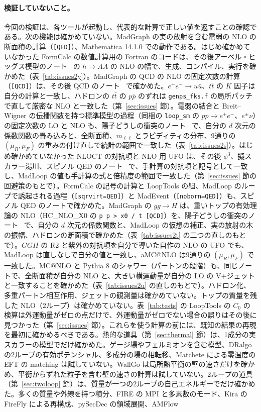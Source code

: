 \documentclass[a4paper,10pt]{ltjsarticle}
\begin{document}
\paragraph{検証していないこと。}今回の検証は、各ツールが起動し、代表的な計算で正しい値を返すことの確認である。次の機能は確かめていない。MadGraph の実の放射を含む電弱の NLO の断面積の計算（\texttt{[QED]}）、Mathematica 14.1.0 での動作である。はじめ確かめていなかった FormCalc の数値計算用の Fortran のコードは、その後アーベル・ヒッグス模型のノート~\cite{ahnote} の $h\to AA$ の NLO の幅で、生成、コンパイル、実行を確かめた（表~\ref{tab:issues2y}）。MadGraph の QCD の NLO の固定次数の計算（\texttt{[QCD]}）は、その後 QCD のノート~\cite{qcdnote} で確かめた。$e^+e^-\to u\bar u$、$t\bar t$ の $K$ 因子は自分の計算と一致し、ハドロンの $t\bar t$ の $p\bar p$ のずれは \texttt{genps\_fks.f} の局所パッチで直して厳密な NLO と一致した（第~\ref{sec:issues} 節）。電弱の結合と Breit--Wigner の伝播関数を持つ標準模型の過程（同梱の \texttt{loop\_sm} の $pp\to e^+e^-$、$e^\pm\nu$）の固定次数の LO と NLO も、陽子どうしの衝突のノート~\cite{ppnote} で、自分の $d$ 次元の係数関数の畳み込みと、全断面積、$m_{\ell\ell}$ とラピディティの分布、9通りの $(\mu_R,\mu_F)$ の重みの付け直しで統計の範囲で一致した（表~\ref{tab:issues2s}）。はじめ確かめていなかった NLOCT の対抗項と NLO 用 UFO は、その後 $\phi^3$、擬スカラー湯川、スピノル QED のノート~\cite{phi3note,yukawanote,qednote} で、手計算の対抗項と記号として一致し、MadLoop の値も手計算の式と倍精度の範囲で一致した（第~\ref{sec:issues} 節の回避策のもとで）。FormCalc の記号の計算と LoopTools の組、MadLoop のループで誘起される過程（\texttt{[sqrvirt=QED]}）と MadEvent（\texttt{[noborn=QED]}）も、スピノル QED のノートで確かめた。MadGraph の $gg\to H$ は、重いトップの有効理論の NLO（HC\_NLO\_X0 の \texttt{p p > x0 / t [QCD]}）を、陽子どうしの衝突のノート~\cite{ppnote} で、自分の $d$ 次元の係数関数と、MadLoop の仮想の補正、実の放射の木の振幅、ハドロンの断面積で確かめた（表~\ref{tab:issues2t} の二つの直しのもとで）。$GGH$ の R2 と紫外の対抗項を自分で導いた自作の NLO の UFO でも、MadLoop は直しなしで自分の値と一致し、aMC@NLO は9通りの $(\mu_R,\mu_F)$ で一致した。MC@NLO と Pythia 8 のシャワー（パートンの段階）も、同じノートで、全断面積が自分の NLO と、大きい横運動量が自分の LO の V$+$ジェットと一致することを確かめた（表~\ref{tab:issues2u} の直しのもとで）。ハドロン化、多重パートン相互作用、ジェットの観測量は確かめていない。トップの質量を残した NLO（2ループ）は確かめていない。表~\ref{tab:tests} の LoopTools の $C_0$ の検算は外運動量がゼロの点だけで、外運動量がゼロでない場合の誤りはその後に見つかった（第~\ref{sec:issues} 節）。これらを使う計算の前には、既知の結果の再現を最初に確かめるべきである。熱的な道具（第~\ref{sec:thermal} 節）は、1成分の実スカラーの模型でだけ確かめた。ゲージ場やフェルミオンを含む模型、DRalgo の2ループの有効ポテンシャル、多成分の場の相転移、Matchete による零温度の EFT の matching は試していない。WallGo は局所熱平衡の壁の速さだけを確かめ、平衡からずれた粒子を含む壁の速さの計算は試していない。2ループの道具（第~\ref{sec:twoloop} 節）は、質量が一つの2ループの自己エネルギーでだけ確かめた。多くの質量や外線を持つ積分、FIRE の MPI と多素数のモード、Kira の FireFly による再構成、pySecDec の領域展開、AMFlow 
\end{document}
